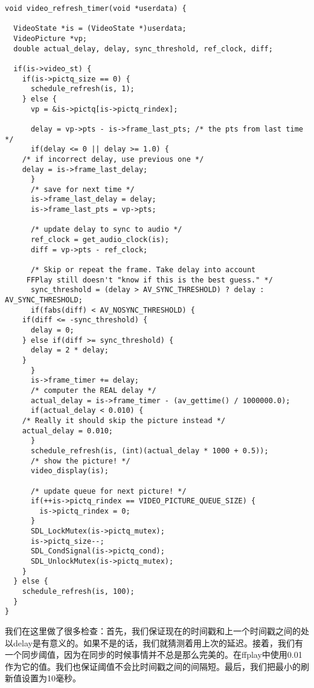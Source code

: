 \begin{lstlisting}
void video_refresh_timer(void *userdata) {

  VideoState *is = (VideoState *)userdata;
  VideoPicture *vp;
  double actual_delay, delay, sync_threshold, ref_clock, diff;

  if(is->video_st) {
    if(is->pictq_size == 0) {
      schedule_refresh(is, 1);
    } else {
      vp = &is->pictq[is->pictq_rindex];

      delay = vp->pts - is->frame_last_pts; /* the pts from last time */
      if(delay <= 0 || delay >= 1.0) {
    /* if incorrect delay, use previous one */
    delay = is->frame_last_delay;
      }
      /* save for next time */
      is->frame_last_delay = delay;
      is->frame_last_pts = vp->pts;

      /* update delay to sync to audio */
      ref_clock = get_audio_clock(is);
      diff = vp->pts - ref_clock;

      /* Skip or repeat the frame. Take delay into account
     FFPlay still doesn't "know if this is the best guess." */
      sync_threshold = (delay > AV_SYNC_THRESHOLD) ? delay : AV_SYNC_THRESHOLD;
      if(fabs(diff) < AV_NOSYNC_THRESHOLD) {
    if(diff <= -sync_threshold) {
      delay = 0;
    } else if(diff >= sync_threshold) {
      delay = 2 * delay;
    }
      }
      is->frame_timer += delay;
      /* computer the REAL delay */
      actual_delay = is->frame_timer - (av_gettime() / 1000000.0);
      if(actual_delay < 0.010) {
    /* Really it should skip the picture instead */
    actual_delay = 0.010;
      }
      schedule_refresh(is, (int)(actual_delay * 1000 + 0.5));
      /* show the picture! */
      video_display(is);

      /* update queue for next picture! */
      if(++is->pictq_rindex == VIDEO_PICTURE_QUEUE_SIZE) {
        is->pictq_rindex = 0;
      }
      SDL_LockMutex(is->pictq_mutex);
      is->pictq_size--;
      SDL_CondSignal(is->pictq_cond);
      SDL_UnlockMutex(is->pictq_mutex);
    }
  } else {
    schedule_refresh(is, 100);
  }
}
\end{lstlisting}

我们在这里做了很多检查：首先，我们保证现在的时间戳和上一个时间戳之间的处以delay是有意义的。如果不是的话，我们就猜测着用上次的延迟。接着，我们有一个同步阈值，因为在同步的时候事情并不总是那么完美的。在ffplay中使用0.01 作为它的值。我们也保证阈值不会比时间戳之间的间隔短。最后，我们把最小的刷新值设置为10毫秒。


